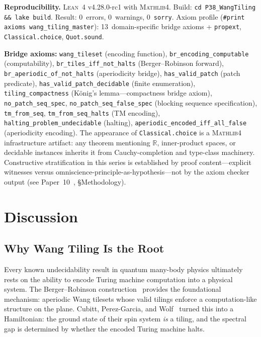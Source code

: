 \documentclass[11pt,a4paper]{article}
\theoremstyle{plain}
\theoremstyle{definition}
\newcommand{\RR}{\mathbb{R}}
\newcommand{\Lean}{\textsc{Lean~4}}
\newcommand{\Mathlib}{\textsc{Mathlib4}}
\begin{document}
\begin{mdframed}[linewidth=1pt, linecolor=black!40,
  backgroundcolor=blue!3, roundcorner=5pt]
\textbf{Reproducibility.}
\Lean{} v4.28.0-rc1 with \Mathlib{}.
Build: \texttt{cd P38\_WangTiling \&\& lake build}.
Result: 0~errors, 0~warnings, 0~\texttt{sorry}.
Axiom profile (\texttt{\#print axioms wang\_tiling\_master}):
13~domain-specific bridge axioms
+ \texttt{propext}, \texttt{Classical.choice}, \texttt{Quot.sound}.

\smallskip\noindent
\textbf{Bridge axioms:}
\texttt{wang\_tileset} (encoding function),
\texttt{br\_encoding\_computable} (computability),
\texttt{br\_tiles\_iff\_not\_halts} (Berger--Robinson forward),
\texttt{br\_aperiodic\_of\_not\_halts} (aperiodicity bridge),
\texttt{has\_valid\_patch} (patch predicate),
\texttt{has\_valid\_patch\_decidable} (finite enumeration),
\texttt{tiling\_compactness} (K\"onig's lemma---compactness bridge axiom),
\texttt{no\_patch\_seq\_spec},
\texttt{no\_patch\_seq\_false\_spec} (blocking sequence specification),
\texttt{tm\_from\_seq},
\texttt{tm\_from\_seq\_halts} (TM encoding),
\texttt{halting\_problem\_undecidable} (halting),
\texttt{aperiodic\_encoded\_iff\_all\_false} (aperiodicity encoding).
The appearance of \texttt{Classical.choice} is a \Mathlib{}
infrastructure artifact: any theorem mentioning $\RR$, inner-product
spaces, or decidable instances inherits it from Cauchy-completion
and type-class machinery.  Constructive stratification in this series
is established by proof content---explicit witnesses versus
omniscience-principle-as-hypothesis---not by the axiom checker output
(see Paper~10~\cite{Lee26P10}, \S Methodology).
\end{mdframed}

\section{Discussion}\label{sec:discussion}

\subsection{Why Wang Tiling Is the Root}

Every known undecidability result in quantum many-body physics
ultimately rests on the ability to encode Turing machine computation
into a physical system.  The Berger--Robinson construction~\cite{Berger1966,Robinson1971}
provides the foundational mechanism: aperiodic Wang tilesets whose
valid tilings enforce a computation-like structure on the plane.
Cubitt, Perez-Garcia, and Wolf~\cite{CPgW2015} turned this into a
Hamiltonian: the ground state of their spin system \emph{is} a tiling,
and the spectral gap is determined by whether the encoded Turing
machine halts.
\end{document}
